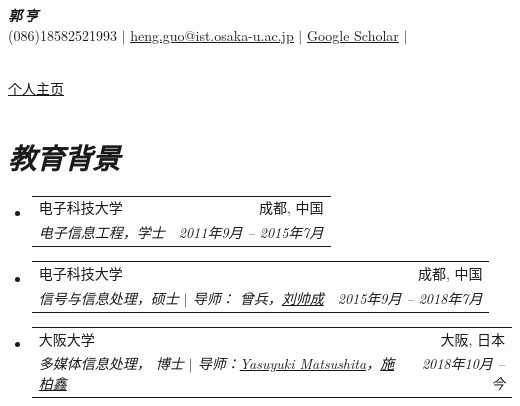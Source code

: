 \documentclass[UTF8]{ctexart}
\makeatletter
\newcommand{\resumeSubheading}[4]{
	\vspace{-2pt}\item
	\begin{tabular*}{0.97\textwidth}[t]{l@{\extracolsep{\fill}}r}
		#1 & #2 \\
		\textit{\small#3} & \textit{\small #4} \\
	\end{tabular*}\vspace{-7pt}
}
\newcommand{\resumeSubHeadingListStart}{\begin{itemize}[leftmargin=0.15in, label={}]}
\newcommand{\resumeSubHeadingListEnd}{\end{itemize}}
\makeatother
\begin{document}
	\begin{minipage}[c]{0.9\textwidth}
	\begin{center}
		\textbf{\Huge \scshape  \textit{郭$\,$亨}} \\ \vspace{14pt}
		(086)18582521993 $|$ \href{mailto:heng.guo@ist.osaka-u.ac.jp}{\underline{heng.guo@ist.osaka-u.ac.jp}} $|$ 
		\href{https://scholar.google.com/citations?user=HKu6gF4AAAAJ&hl=zh-CN}{\underline{Google Scholar}} $|$ 
	\end{center}
	\end{minipage}
	\hspace{-2em}
	\begin{minipage}[r]{0.05\textwidth}
		\centering
		\\
		\vspace{-1em}
		\href{https://gh-home.github.io/}{\underline{个人主页}}
	\end{minipage}

	
	\vspace{-0.5em}
	\section{\textit{\textbf{教育背景}}}
	\resumeSubHeadingListStart
	\resumeSubheading
	{电子科技大学}{成都, 中国}
	{电子信息工程，学士}{\rm  2011年9月 -- 2015年7月}
		\vspace{0.3em}
	\resumeSubheading
	{电子科技大学}{成都, 中国}
	{信号与信息处理，硕士 $|$ 导师： 曾兵，\href{http://www.liushuaicheng.org/}{刘帅成}}{\rm 2015年9月 -- 2018年7月}
		\vspace{0.3em}
	\resumeSubheading
	{大阪大学}{大阪, 日本}
	{多媒体信息处理， 博士 $|$ 导师：\href{http://cvl.ist.osaka-u.ac.jp/en/member/matsushita/}{Yasuyuki Matsushita}，\href{https://cs.pku.edu.cn/info/1073/1888.htm}{施柏鑫}}{\rm  2018年10月 -- 今}
	\resumeSubHeadingListEnd
	
\end{document}
